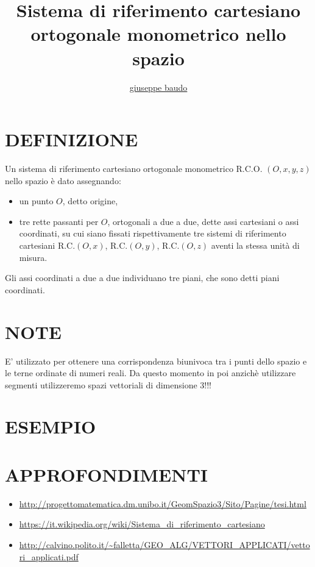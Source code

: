 \documentclass[a4paper,10pt]{article}
\title{Sistema di riferimento cartesiano ortogonale monometrico nello spazio}
\author{\href{http://www.baudo.hol.es}{giuseppe baudo}}
\begin{document}
\maketitle

\section{DEFINIZIONE}
Un sistema di riferimento cartesiano ortogonale monometrico R.C.O. $(O,x,y,z)$ nello spazio è dato assegnando:
\begin{itemize}
 \item un punto $O$, detto origine,
 \item tre rette passanti per $O$, ortogonali a due a due, dette assi cartesiani o assi coordinati, su cui siano fissati rispettivamente tre sistemi di riferimento cartesiani R.C.$(O,x)$, R.C.$(O,y)$, R.C.$(O,z)$ aventi la stessa unità di misura.
\end{itemize}
Gli assi coordinati a due a due individuano tre piani, che sono detti piani coordinati.

\section{NOTE}
E' utilizzato per ottenere una corrispondenza biunivoca tra i punti dello spazio e le terne ordinate di numeri reali. Da questo momento in poi anzichè utilizzare segmenti utilizzeremo spazi vettoriali di dimensione 3!!!

\section{ESEMPIO}

\section{APPROFONDIMENTI}
\begin{itemize}
 \item \url{http://progettomatematica.dm.unibo.it/GeomSpazio3/Sito/Pagine/tesi.html}
 \item \url{https://it.wikipedia.org/wiki/Sistema_di_riferimento_cartesiano}
 \item \url{http://calvino.polito.it/~falletta/GEO_ALG/VETTORI_APPLICATI/vettori_applicati.pdf}
\end{itemize}
\end{document}
